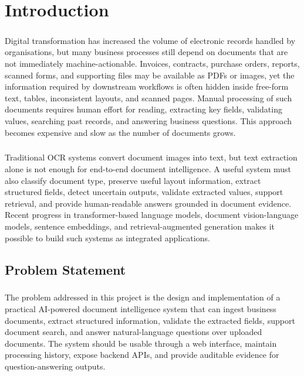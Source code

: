\chapter{Introduction}
\label{chap:introduction}

\paragraph{} Digital transformation has increased the volume of electronic records handled by organisations, but many business processes still depend on documents that are not immediately machine-actionable. Invoices, contracts, purchase orders, reports, scanned forms, and supporting files may be available as PDFs or images, yet the information required by downstream workflows is often hidden inside free-form text, tables, inconsistent layouts, and scanned pages. Manual processing of such documents requires human effort for reading, extracting key fields, validating values, searching past records, and answering business questions. This approach becomes expensive and slow as the number of documents grows.

\paragraph{} Traditional OCR systems convert document images into text, but text extraction alone is not enough for end-to-end document intelligence. A useful system must also classify document type, preserve useful layout information, extract structured fields, detect uncertain outputs, validate extracted values, support retrieval, and provide human-readable answers grounded in document evidence. Recent progress in transformer-based language models, document vision-language models, sentence embeddings, and retrieval-augmented generation makes it possible to build such systems as integrated applications.

\section{Problem Statement}
\paragraph{} The problem addressed in this project is the design and implementation of a practical AI-powered document intelligence system that can ingest business documents, extract structured information, validate the extracted fields, support document search, and answer natural-language questions over uploaded documents. The system should be usable through a web interface, maintain processing history, expose backend APIs, and provide auditable evidence for question-answering outputs.

